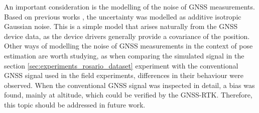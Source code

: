 An important consideration is the modelling of the noise of GNSS measurements. Based on previous works \cite{cioffi2020tightly, boche2022dropout}, the uncertainty was modelled as additive isotropic Gaussian noise. This is a simple model that arises naturally from the GNSS device data, as the device drivers generally provide a covariance of the position. Other ways of modelling the noise of GNSS measurements in the context of pose estimation are worth studying, as when comparing the simulated signal in the section \ref{sec:experiments_rosario_dataset} experiment with the conventional GNSS signal used in the field experiments, differences in their behaviour were observed. When the conventional GNSS signal was inspected in detail, a bias was found, mainly at altitude, which could be verified by the GNSS-RTK. Therefore, this topic should be addressed in future work.
